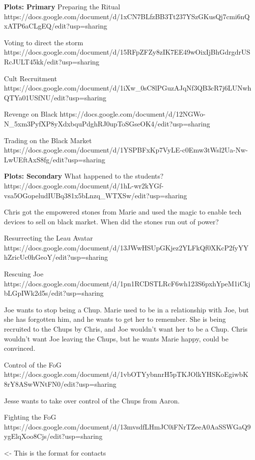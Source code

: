 \documentclass[char]{GL2020}
\begin{document}
\textbf{Plots: Primary}
Preparing the Ritual
https://docs.google.com/document/d/1xCN7BLfzBB3Tt237YSzGKusQj7cmi6nQxATP6aCLgEQ/edit?usp=sharing

Voting to direct the storm
https://docs.google.com/document/d/15RFpZFZy8zIK7EE49wOixIjBhGdrgdrUSRcJULT45kk/edit?usp=sharing

Cult Recruitment
https://docs.google.com/document/d/1iXw_0sC8lPGuzAJqNf3QB3cR7j6LUNwhQTYa01USfNU/edit?usp=sharing

Revenge on Black
https://docs.google.com/document/d/12NGWo-N_5xm3PyfXP8yXdxbquPdghRJ0upToSGseOK4/edit?usp=sharing

Trading on the Black Market
https://docs.google.com/document/d/1YSPBFxKp7VyLE-c0Emw3tWsl2Ua-Nw-LwUEftAxS8fg/edit?usp=sharing

\textbf{Plots: Secondary}
What happened to the students?
https://docs.google.com/document/d/1hL-wr2kYGf-vsa5OGopeludIUBq381x5bLnzq_WTXSw/edit?usp=sharing

Chris got the empowered stones from Marie and used the magic to enable tech devices to sell on black market.  When did the stones run out of power?

Resurrecting the Leau Avatar
https://docs.google.com/document/d/13JWwHSUpGKjez2YLFkQf0XKcP2fyYYhZricUc0hGeoY/edit?usp=sharing

Rescuing Joe
https://docs.google.com/document/d/1pn1RCDSTLRcF6wh123S6pxhYpeM1iCkjbLGpIWk2d5s/edit?usp=sharing

Joe wants to stop being a Chup.  Marie used to be in a relationship with Joe, but she has forgotten him, and he wants to get her to remember.  She is being recruited to the Chups by Chris, and Joe wouldn't want her to be a Chup.  Chris wouldn't want Joe leaving the Chups, but he wants Marie happy, could be convinced.

Control of the FoG
https://docs.google.com/document/d/1vbOTYybnnrH5pTKJOlkYHSKoEgiwbK8rY8ASwWNtFN0/edit?usp=sharing

Jesse wants to take over control of the Chups from Aaron.

Fighting the FoG
https://docs.google.com/document/d/13mvsdfLHmJC0iFNrTZeeA0AaSSWGaQ9ygElqXoo8Cjs/edit?usp=sharing

\begin{itemz}[Goals]
	\item 
\end{itemz}

\begin{itemz}[Notes]
	\item 
\end{itemz}

\begin{contacts}
	\contact{\cTest{}} <- This is the format for contacts 
\end{contacts}
\end{document}
